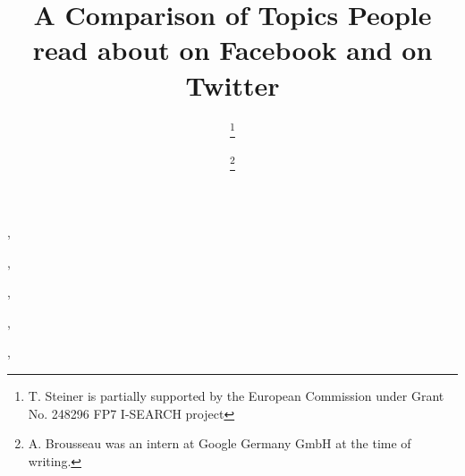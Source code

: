 \documentclass{iosart2c}
\begin{document}
\begin{frontmatter}

\title{A Comparison of Topics People read about on Facebook and on Twitter
}




\author[A]{ \thanks{T. Steiner is partially supported by the European Commission under Grant No. 248296 FP7 I-SEARCH project}},
\author[B]{ },
\author[A]{ \thanks{A. Brousseau was an intern at Google Germany GmbH at the time of writing.}},
\author[C]{ },
\author[B]{ },
\author[D]{ }


\address[A]{Google Germany GmbH, ABC-Str. 19, 20354 Hamburg, Germany,\\
E-mail: tomac@google.com, arnaud.brousseau@gmail.com}
\address[B]{Ghent University -- IBBT, ELIS, Multimedia Lab, Gaston Crommenlaan 8/201, 9050 Ghent, Belgium,\\
E-mail: ruben.verborgh@ugent.be, rik.vandewalle@ugent.be}
\address[C]{EURECOM, Sophia Antipolis, France\\
E-mail: raphael.troncy@eurecom.fr}
\address[D]{Universitat Polit\`{e}cnica de Catalunya, Department LSI, 08034 Barcelona, Spain,\\
E-mail: gabarro@lsi.upc.edu}


\end{frontmatter}
\end{document}
